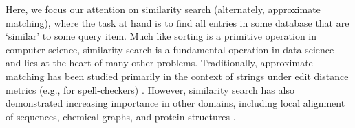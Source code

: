 \documentclass{amsbook}
\theoremstyle{definition}
\theoremstyle{remark}
\numberwithin{equation}{section}
\begin{document}
Here, we focus our attention on similarity search (alternately, approximate matching), where the task at hand is to find all entries in some database that are `similar' to some query item.
Much like sorting is a primitive operation in computer science, similarity search is a fundamental operation in data science and lies at the heart of many other problems.
Traditionally, approximate matching has been studied primarily in the context of strings under edit distance metrics (e.g., for spell-checkers) \cite{ukkonen1985algorithms}.
However, similarity search has also demonstrated increasing importance in other domains, including local alignment of sequences, chemical graphs, and protein structures \cite{altschul1990basic, kent2002blat, schaeffer2007graph, budowski2010fragbag}.
\end{document}
